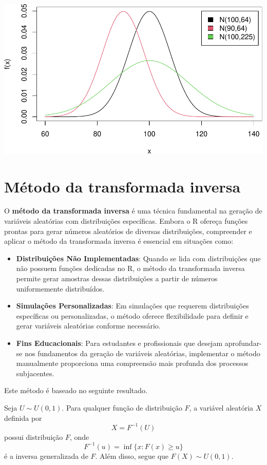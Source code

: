 \documentclass[
]{book}
\providecommand{\tightlist}{%
  \setlength{\itemsep}{0pt}\setlength{\parskip}{0pt}}
\begin{document}
\includegraphics{introR_files/figure-latex/unnamed-chunk-275-1.pdf}

\chapter{Método da transformada inversa}\label{muxe9todo-da-transformada-inversa}

O \textbf{método da transformada inversa} é uma técnica fundamental na geração de variáveis aleatórias com distribuições específicas. Embora o R ofereça funções prontas para gerar números aleatórios de diversas distribuições, compreender e aplicar o método da transformada inversa é essencial em situações como:

\begin{itemize}
\tightlist
\item
  \textbf{Distribuições Não Implementadas}: Quando se lida com distribuições que não possuem funções dedicadas no R, o método da transformada inversa permite gerar amostras dessas distribuições a partir de números uniformemente distribuídos.
\item
  \textbf{Simulações Personalizadas}: Em simulações que requerem distribuições específicas ou personalizadas, o método oferece flexibilidade para definir e gerar variáveis aleatórias conforme necessário.
\item
  \textbf{Fins Educacionais}: Para estudantes e profissionais que desejam aprofundar-se nos fundamentos da geração de variáveis aleatórias, implementar o método manualmente proporciona uma compreensão mais profunda dos processos subjacentes.
\end{itemize}

Este método é baseado no seguinte resultado.

Seja \(U\sim U(0,1)\). Para qualquer função de distribuição \(F\), a variável aleatória \(X\) definida por \[X = F^{-1}(U)\] possui distribuição \(F\), onde \[F^{-1}(u) = \inf\{x: F(x)\geq u\}\] é a inversa generalizada de \(F\). Além disso, segue que \(F(X)\sim U(0,1)\).
\end{document}
